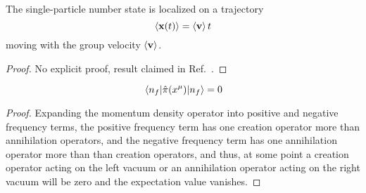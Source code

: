 \begin{lemma}\label{thm:number_state_single_localization}
	The single-particle number state is localized on a trajectory
	\begin{equation}
		\expval{\vb{x}(t)}
		=
		\expval{\vb{v}}t
	\end{equation}
	moving with the group velocity $\expval{\vb{v}}$.
\end{lemma}
\begin{proof}
	No explicit proof, result claimed in Ref.~\cite[eq.~38]{Naumov2013}.
\end{proof}

\begin{lemma}\label{thm:number_state_momentum_density_mean}
	\begin{equation}
		\expval{\hat\pi(x^\mu)}{n_f}
		=
		0
	\end{equation}
\end{lemma}
\begin{proof}
	Expanding the momentum density operator into positive and negative frequency terms, the positive frequency term has one creation operator more than annihilation operators, and the negative frequency term has one annihilation operator more than than creation operators, and thus, at some point a creation operator acting on the left vacuum or an annihilation operator acting on the right vacuum will be zero and the expectation value vanishes.
\end{proof}

